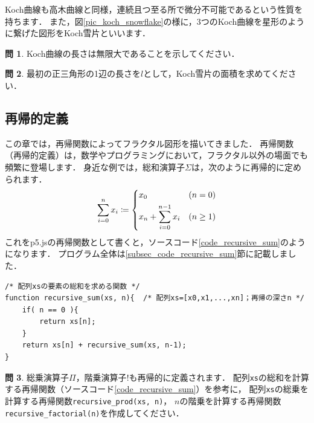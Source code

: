 \documentclass[dvipdfmx]{jsarticle}
\theoremstyle{definition}
\newtheorem{question}{問}[section]
\begin{document}
Koch曲線も高木曲線と同様，連続且つ至る所で微分不可能であるという性質を持ちます．
また，図\ref{pic_koch_snowflake}の様に，3つのKoch曲線を星形のように繋げた図形をKoch雪片といいます．

\begin{question}
    Koch曲線の長さは無限大であることを示してください．
\end{question}

\begin{question}
    最初の正三角形の1辺の長さを$l$として，Koch雪片の面積を求めてください．
\end{question}

\subsection{再帰的定義}  \label{subsec_recursion}
この章では，再帰関数によってフラクタル図形を描いてきました．
再帰関数（再帰的定義）は，数学やプログラミングにおいて，フラクタル以外の場面でも頻繁に登場します．
身近な例では，総和演算子$\Sigma$は，次のように再帰的に定められます．
%
\begin{align*}
    \sum_{i=0}^{n} x_i \coloneqq
        \begin{dcases}
            x_0 & (n = 0) \\
            x_n + \sum_{i=0}^{n-1} x_i & (n \geq 1)
        \end{dcases}
\end{align*}
%
これをp5.jsの再帰関数として書くと，ソースコード\ref{code_recursive_sum}のようになります．
プログラム全体は\ref{subsec_code_recursive_sum}節に記載しました．
%
\begin{lstlisting}[caption=総和を計算する再帰関数, label=code_recursive_sum]
/* 配列xsの要素の総和を求める関数 */
function recursive_sum(xs, n){  /* 配列xs=[x0,x1,...,xn]；再帰の深さn */
    if( n == 0 ){
        return xs[n];
    }
    return xs[n] + recursive_sum(xs, n-1);
}
\end{lstlisting}

\begin{question}
    総乗演算子$\Pi$，階乗演算子$!$も再帰的に定義されます．
    配列\verb|xs|の総和を計算する再帰関数（ソースコード\ref{code_recursive_sum}）を参考に，
    配列\verb|xs|の総乗を計算する再帰関数\verb|recursive_prod(xs, n)|，
    $n$の階乗を計算する再帰関数\verb|recursive_factorial(n)|を作成してください．
\end{question}
\end{document}
